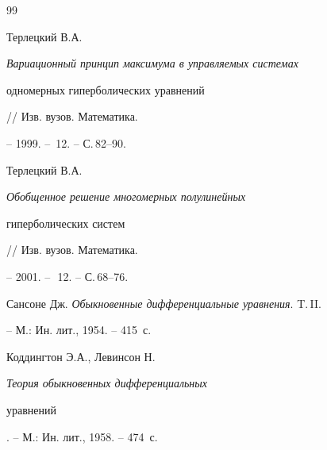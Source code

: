 \begin{thebibliography}{99}


Терлецкий В.А. {\em Вариационный принцип максимума в управляемых системах


одномерных гиперболических уравнений} // Изв. вузов. Математика.


-- 1999. -- \No\,12. -- С.\,82--90.




Терлецкий В.А. {\em Обобщенное решение многомерных полулинейных 


гиперболических систем} // Изв. вузов. Математика.


-- 2001. -- \No\,\,12. -- С.\,68--76.




Сансоне Дж. {\em Обыкновенные дифференциальные уравнения}. T.\,II.


-- М.: Ин. лит., 1954. -- 415~с.




Коддингтон Э.А., Левинсон Н. {\em Теория обыкновенных дифференциальных


уравнений}. -- М.: Ин. лит., 1958. -- 474~с.





\end{thebibliography}





\vskip 2cm












\label{end}





